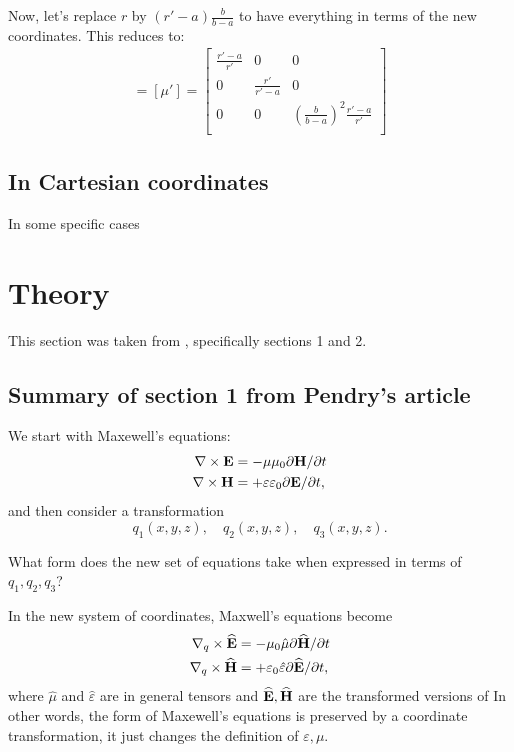 \documentclass{amsart}
\begin{document}
Now, let's replace \(r\) by \((r'-a)\frac{b}{b-a}\) to have everything
in terms of the new coordinates. This reduces to:
\begin{align}
  [\varepsilon'] =[\mu']=\begin{bmatrix}
    \frac{r'-a}{r'} & 0 & 0\\
    0 & \frac{r'}{r'-a} & 0\\
    0 & 0 & \left(\frac{b}{b-a}\right)^2\frac{r'-a}{r'}\\
  \end{bmatrix}
\end{align}

\subsection{In Cartesian coordinates}
In some specific cases


\section{Theory}
This section was taken from \cite{ward96}, specifically sections 1 and 2.
\subsection{Summary of section 1 from Pendry's article}
We start with Maxewell's equations:
\begin{align*}
  \nabla \times \textbf{E} &= -\mu \mu_0 \partial \textbf{H} /\partial t\\
  \nabla \times \textbf{H} &= +\varepsilon \varepsilon_0 \partial \textbf{E} /\partial t,
\end{align*}
and then consider a transformation
\[
q_1(x,y,z), \quad q_2(x,y,z), \quad q_3(x,y,z).
\]

 What form does the new set of equations take when
expressed in terms of $q_1,q_2,q_3$?

 In the new system of coordinates, Maxwell's equations become
\begin{align*}
  \nabla_q \times \widehat{\textbf{E}} &= -\mu_0\hat{\mu} \partial \widehat{\textbf{H}}/\partial t\\
  \nabla_q \times \widehat{\textbf{H}} &= +\varepsilon_0 \hat{\varepsilon} \partial \widehat{\textbf{E}}/\partial t,
\end{align*}
where $\hat{\mu}$ and $\hat{\varepsilon}$ are in general tensors and $\widehat{\textbf{E}},\widehat{\textbf{H}}$ are the transformed versions of 
In other words, the form of Maxewell's equations is preserved by a coordinate transformation, it just changes the definition of $\varepsilon,\mu$.
\end{document}

